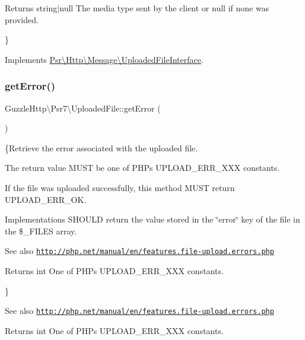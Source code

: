 \begin{DoxyReturn}{Returns}
string$\vert$null The media type sent by the client or null if none was provided.
\end{DoxyReturn}
\} 

Implements \hyperlink{interfacePsr_1_1Http_1_1Message_1_1UploadedFileInterface_a5996e9ed494dd17fa7839de56995feee}{Psr\textbackslash{}\+Http\textbackslash{}\+Message\textbackslash{}\+Uploaded\+File\+Interface}.

\mbox{\label{classGuzzleHttp_1_1Psr7_1_1UploadedFile_abf88819e67fdc112aa01fcd722e784d4}} 
\subsubsection{\texorpdfstring{get\+Error()}{getError()}}
{\footnotesize\ttfamily Guzzle\+Http\textbackslash{}\+Psr7\textbackslash{}\+Uploaded\+File\+::get\+Error (\begin{DoxyParamCaption}{ }\end{DoxyParamCaption})}

\{Retrieve the error associated with the uploaded file.

The return value M\+U\+ST be one of P\+HP\textquotesingle{}s U\+P\+L\+O\+A\+D\+\_\+\+E\+R\+R\+\_\+\+X\+XX constants.

If the file was uploaded successfully, this method M\+U\+ST return U\+P\+L\+O\+A\+D\+\_\+\+E\+R\+R\+\_\+\+OK.

Implementations S\+H\+O\+U\+LD return the value stored in the \char`\"{}error\char`\"{} key of the file in the \$\+\_\+\+F\+I\+L\+ES array.

\begin{DoxySeeAlso}{See also}
\href{http://php.net/manual/en/features.file-upload.errors.php}{\tt http\+://php.\+net/manual/en/features.\+file-\/upload.\+errors.\+php} 
\end{DoxySeeAlso}
\begin{DoxyReturn}{Returns}
int One of P\+HP\textquotesingle{}s U\+P\+L\+O\+A\+D\+\_\+\+E\+R\+R\+\_\+\+X\+XX constants.
\end{DoxyReturn}
\}

\begin{DoxySeeAlso}{See also}
\href{http://php.net/manual/en/features.file-upload.errors.php}{\tt http\+://php.\+net/manual/en/features.\+file-\/upload.\+errors.\+php} 
\end{DoxySeeAlso}
\begin{DoxyReturn}{Returns}
int One of P\+HP\textquotesingle{}s U\+P\+L\+O\+A\+D\+\_\+\+E\+R\+R\+\_\+\+X\+XX constants. 
\end{DoxyReturn}


